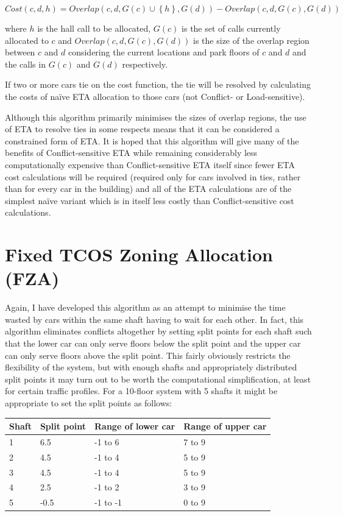 \documentclass{UoYCSproject}
\begin{document}
\[ Cost(c, d, h) = Overlap(c, d, G(c) \cup \left\{ h \right\}, G(d)) - Overlap(c, d, G(c), G(d)) \]

where $h$ is the hall call to be allocated, $G(c)$ is the set of calls currently allocated to $c$ and $Overlap(c, d, G(c), G(d))$ is the size of the overlap region between $c$ and $d$ considering the current locations and park floors of $c$ and $d$ and the calls in $G(c)$ and $G(d)$ respectively.

If two or more cars tie on the cost function, the tie will be resolved by calculating the costs of na\"{i}ve ETA allocation to those cars (not Conflict- or Load-sensitive).

Although this algorithm primarily minimises the sizes of overlap regions, the use of ETA to resolve ties in some respects means that it can be considered a constrained form of ETA.  It is hoped that this algorithm will give many of the benefits of Conflict-sensitive ETA while remaining considerably less computationally expensive than Conflict-sensitive ETA itself since fewer ETA cost calculations will be required (required only for cars involved in ties, rather than for every car in the building) and all of the ETA calculations are of the simplest na\"{i}ve variant which is in itself less costly than Conflict-sensitive cost calculations.

\section{Fixed TCOS Zoning Allocation (FZA)}

Again, I have developed this algorithm as an attempt to minimise the time wasted by cars within the same shaft having to wait for each other.  In fact, this algorithm eliminates conflicts altogether by setting split points for each shaft such that the lower car can only serve floors below the split point and the upper car can only serve floors above the split point.  This fairly obviously restricts the flexibility of the system, but with enough shafts and appropriately distributed split points it may turn out to be worth the computational simplification, at least for certain traffic profiles.  For a 10-floor system with 5 shafts it might be appropriate to set the split points as follows:

\begin{tabular}{l | l | l | l}
	Shaft & Split point & Range of lower car & Range of upper car \\
	\hline
	1 & 6.5  & -1 to 6  & 7 to 9 \\
	2 & 4.5  & -1 to 4  & 5 to 9 \\
	3 & 4.5  & -1 to 4  & 5 to 9 \\
	4 & 2.5  & -1 to 2  & 3 to 9 \\
	5 & -0.5 & -1 to -1 & 0 to 9
\end{tabular}
\end{document}
